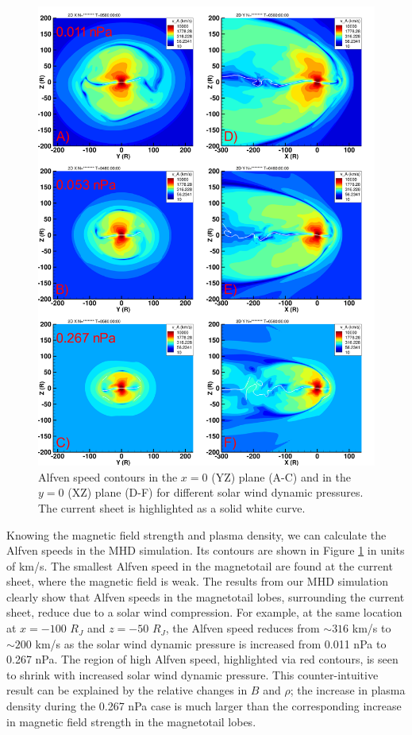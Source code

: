 \begin{figure}
    \centering
    \includegraphics[height=0.9\textheight]{images5/compare_runs_currentsheet_AlfvenSpeed.png}
    \caption{Alfven speed contours in the $x=0$ (YZ) plane (A-C) and in the $y=0$ (XZ) plane (D-F) for different solar wind dynamic pressures. The current sheet is highlighted as a solid white curve.}
    \label{fig:chp5-comparison-slices-alfven}
\end{figure}

Knowing the magnetic field strength and plasma density, we can calculate the Alfven speeds in the MHD simulation. Its contours are shown in Figure \ref{fig:chp5-comparison-slices-alfven} in units of km/s. The smallest Alfven speed in the magnetotail are found at the current sheet, where the magnetic field is weak. The results from our MHD simulation clearly show that Alfven speeds in the magnetotail lobes, surrounding the current sheet, reduce due to a solar wind compression. For example, at the same location at $x=-100$ $R_J$ and $z=-50$ $R_J$, the Alfven speed reduces from $\sim316$ km/s to $\sim200$ km/s as the solar wind dynamic pressure is increased from 0.011 nPa to 0.267 nPa. The region of high Alfven speed, highlighted via red contours, is seen to shrink with increased solar wind dynamic pressure. This counter-intuitive result can be explained by the relative changes in $B$ and $\rho$; the increase in plasma density during the 0.267 nPa case is much larger than the corresponding increase in magnetic field strength in the magnetotail lobes. 

